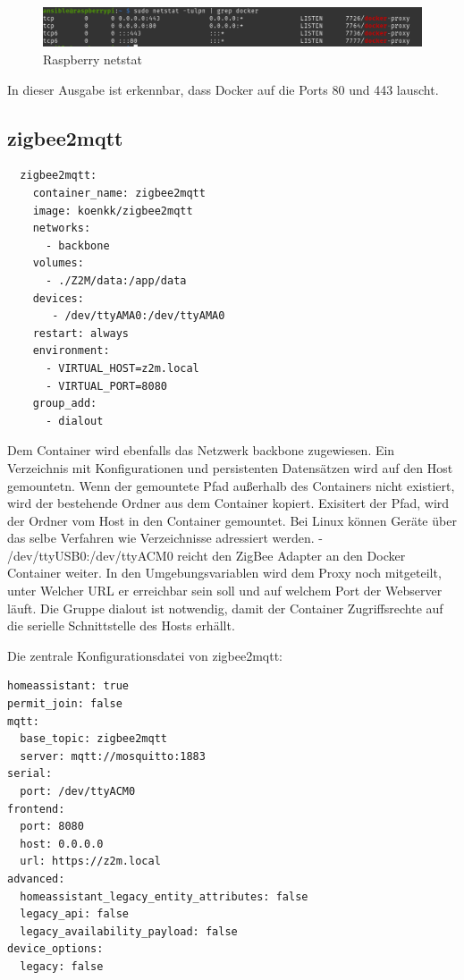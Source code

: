 \begin{figure}[H]
  \centering
  \includegraphics[width=1\textwidth]{media/rasp-netstat.png}
  \caption{Raspberry netstat}
\end{figure}
In dieser Ausgabe ist erkennbar, dass Docker auf die Ports 80 und 443 lauscht.

\subsection{zigbee2mqtt}
\begin{lstlisting}
  zigbee2mqtt:
    container_name: zigbee2mqtt
    image: koenkk/zigbee2mqtt
    networks:
      - backbone
    volumes:
      - ./Z2M/data:/app/data
    devices:
       - /dev/ttyAMA0:/dev/ttyAMA0
    restart: always
    environment:
      - VIRTUAL_HOST=z2m.local
      - VIRTUAL_PORT=8080
    group_add:
      - dialout
\end{lstlisting}

Dem Container wird ebenfalls das Netzwerk \grqq backbone\grqq{} zugewiesen. Ein Verzeichnis mit Konfigurationen und persistenten Datensätzen wird auf den Host gemountetn. Wenn der gemountete Pfad außerhalb des Containers nicht existiert, wird der 
bestehende Ordner aus dem Container kopiert. Exisitert der Pfad, wird der Ordner vom Host in den Container gemountet. 
Bei Linux können Geräte über das selbe Verfahren wie Verzeichnisse adressiert werden. \grqq - /dev/ttyUSB0:/dev/ttyACM0\grqq{} reicht den ZigBee Adapter an 
den Docker Container weiter.
In den Umgebungsvariablen wird dem Proxy noch mitgeteilt, unter Welcher URL er erreichbar sein soll und auf welchem Port der Webserver läuft. Die Gruppe 
\grqq dialout\grqq{} ist notwendig, damit der Container Zugriffsrechte auf die serielle Schnittstelle des Hosts erhällt.

Die zentrale Konfigurationsdatei von \grqq zigbee2mqtt\grqq{}:
\begin{lstlisting}
homeassistant: true
permit_join: false
mqtt:
  base_topic: zigbee2mqtt
  server: mqtt://mosquitto:1883
serial:
  port: /dev/ttyACM0
frontend:
  port: 8080
  host: 0.0.0.0
  url: https://z2m.local
advanced:
  homeassistant_legacy_entity_attributes: false
  legacy_api: false
  legacy_availability_payload: false
device_options:
  legacy: false
\end{lstlisting}

